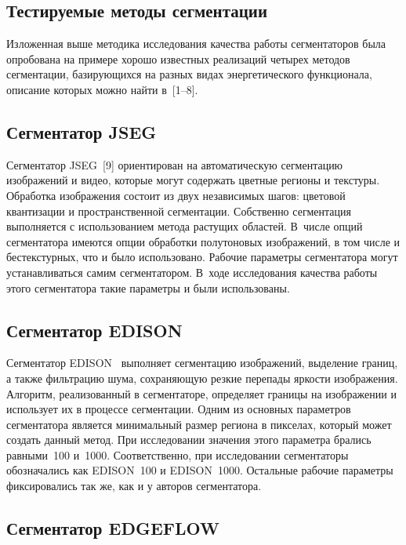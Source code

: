 \begin{multicols}{2}
  \section{Тестируемые методы сегментации}
  
  Изложенная выше методика исследования качества работы сегментаторов 
была опробована на примере хорошо известных реализаций четырех методов 
сегментации, базирующихся на разных видах энергетического функционала, 
описание которых можно найти в~[1--8].
  
  \subsection{Сегментатор JSEG} %
  
  Сегментатор JSEG~[9] ориентирован на автоматическую сегментацию изображений и 
видео, которые могут содержать цветные регионы и текстуры. Обработка 
изображения состоит из двух независимых шагов: цветовой квантизации и 
пространственной сегментации. Собственно сегментация выполняется с 
использованием метода растущих областей. В~чис\-ле опций сегментатора 
имеются опции обработки полутоновых изображений, в том числе и 
бестекстурных, что и было использовано. Рабочие параметры сегментатора 
могут устанавливаться самим сегментатором. В~ходе исследования качества 
работы этого сегментатора такие па\-ра\-мет\-ры и были использованы.
  
  \subsection{Сегментатор EDISON} %
  
  Сегментатор EDISON~\cite{10-kol} выполняет сегментацию изображений, выделение границ, а 
также фильтрацию шума, сохраняющую резкие перепады яркости изоб\-ра\-же\-ния. 
Алгоритм, реализованный в сегментаторе, определяет границы на изображении 
и использует их в процессе сегментации. Одним из основных параметров 
сегментатора является минимальный размер региона в пикселах, который 
может создать данный метод. При исследовании значения этого параметра 
брались равными~100 и~1000. Соответственно, при исследовании 
сегментаторы обозначались как {EDISON~100} и {EDISON~1000}. 
Остальные рабочие параметры фиксировались так же, как и у авторов 
сегментатора.
  
  \subsection{Сегментатор EDGEFLOW} %
  

\end{multicols}
